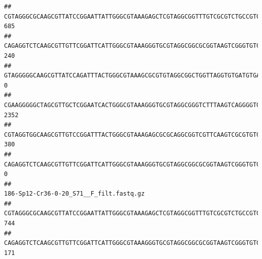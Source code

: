 \documentclass[]{article}
\begin{document}
\begin{verbatim}
## CGTAGGGCGCAAGCGTTATCCGGAATTATTGGGCGTAAAGAGCTCGTAGGCGGTTTGTCGCGTCTGCCGTGAAAGTCCGGGGCTCAACTCCGGATCTGCGGTGGGTACGGGCAGACTAGAGTGATGTAGGGGAGACTGGAATTCCTGGTGTAGCGGTGAAATGCGCAGATATCAGGAGGAACACCGATGGCGAAGGCAGGTCTCTGGGCATTAACTGACGCTGAGGAGCGAAAGCATGGGGAGCGAACA                                     685
## CAGAGGTCTCAAGCGTTGTTCGGATTCATTGGGCGTAAAGGGTGCGTAGGCGGCGCGGTAAGTCGGGTGTGAAATCTCGGAGCTTAACTCCGAAACTGCATTCGATACTGCCGTGCTTGAGGACTGGAGAGGAGACTGGAATTTACGGTGTAGCGGTGAAATGCGTAGATATCGTAAGGAAGACCAGTGGCGAAGGCGGGTCTCTGGACAGTTCCTGACGCTGAGGCACGAAGGCCAGGGGAGCAAACG                                     240
## GTAGGGGGCAAGCGTTATCCAGATTTACTGGGCGTAAAGCGCGTGTAGGCGGCTGGTTAGGTGTGATGTGAAATCTTCCGGCTCAACCGGAAAACTGCATTGCAAACCGGCCTGGCTAGAGTGCAGGAGAGGGAAGCGGAATTCCAGGTGTAGCGGTGAAATGCGTAGATATCTGGAGGAACACCAGTGGCGAAGGCGGCTTCCTGGCCTGCAACTGACGCTGAGACGCGAAAGCGTGGGGAGCGAAC                                        0
## CGAAGGGGGCTAGCGTTGCTCGGAATCACTGGGCGTAAAGGGTGCGTAGGCGGGTCTTTAAGTCAGGGGTGAAATCCTGGAGCTCAACTCCAGAACTGCCTTTGATACTGAAGATCTTGAGTTCGGGAGAGGTGAGTGGAACTGCGAGTGTAGAGGTGAAATTCGTAGATATTCGCAAGAACACCAGTGGCGAAGGCGGCTCACTGGCCCGATACTGACGCTGAGGCACGAAAGCGTGGGGAGCAAACA                                    2352
## CGTAGGTGGCAAGCGTTGTCCGGATTTACTGGGCGTAAAGAGCGCGCAGGCGGTCGTTCAAGTCGCGTGTGAAAGCCCCCGGCTCAACTGGGGAGGGTCACGCGATACTGATCGACTCGAAGGCAGGAGAGGGTAGTGGAATTCCCGGTGTAGTGGTGAAATGCGTAGATATCGGGAGGAACACCAGTGGCGAAGGCGACTACCTGGCCTGTTCTTGACGCTGAGGCGCGAAAGCTAGGGGAGCAAACG                                     380
## CAGAGGTCTCAAGCGTTGTTCGGATTCATTGGGCGTAAAGGGTGCGTAGGCGGCGCGGTAAGTCGGGTGTGAAATCTCGGGGCTTAACTCCGAAACTGCATTCGATACTGCCGTGCTTGAGGACTGGAGAGGAGACTGGAATTTACGGTGTAGCGGTGAAATGCGTAGATATCGTAAGGAAGACCAGTGGCGAAGGCGGGTCTCTGGACAGTTCCTGACGCTGAGGCACGAAGGCCAGGGGAGCAAACG                                       0
##                                                                                                                                                                                                                                                           186-Sp12-Cr36-0-20_S71__F_filt.fastq.gz
## CGTAGGGCGCAAGCGTTATCCGGAATTATTGGGCGTAAAGAGCTCGTAGGCGGTTTGTCGCGTCTGCCGTGAAAGTCCGGGGCTCAACTCCGGATCTGCGGTGGGTACGGGCAGACTAGAGTGATGTAGGGGAGACTGGAATTCCTGGTGTAGCGGTGAAATGCGCAGATATCAGGAGGAACACCGATGGCGAAGGCAGGTCTCTGGGCATTAACTGACGCTGAGGAGCGAAAGCATGGGGAGCGAACA                                     744
## CAGAGGTCTCAAGCGTTGTTCGGATTCATTGGGCGTAAAGGGTGCGTAGGCGGCGCGGTAAGTCGGGTGTGAAATCTCGGAGCTTAACTCCGAAACTGCATTCGATACTGCCGTGCTTGAGGACTGGAGAGGAGACTGGAATTTACGGTGTAGCGGTGAAATGCGTAGATATCGTAAGGAAGACCAGTGGCGAAGGCGGGTCTCTGGACAGTTCCTGACGCTGAGGCACGAAGGCCAGGGGAGCAAACG                                     171

\end{verbatim}
\end{document}
